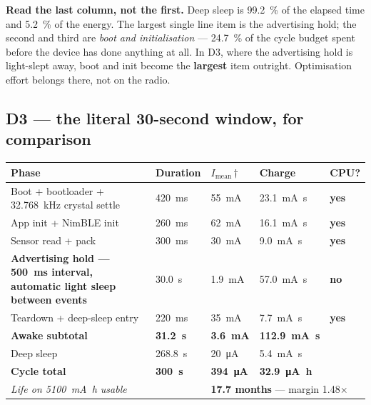 \documentclass[11pt,a4paper]{article}
\newcommand{\yes}{\textcolor{ok}{\textbf{yes}}}
\newcommand{\no}{\textcolor{warn}{\textbf{no}}}
\newcommand{\mock}{\textcolor{warn}{$\dagger$}}
\begin{document}
\medskip
\noindent
\textbf{Read the last column, not the first.} Deep sleep is \SI{99.2}{\percent} of the elapsed time
and \SI{5.2}{\percent} of the energy. The largest single line item is the advertising hold; the
second and third are \emph{boot and initialisation} --- \SI{24.7}{\percent} of the cycle budget
spent before the device has done anything at all. In D3, where the advertising hold is
light-slept away, boot and init become the \textbf{largest} item outright. Optimisation effort
belongs there, not on the radio.

\subsection{D3 --- the literal 30-second window, for comparison}

\begin{center}
\begin{tabularx}{\textwidth}{Xllll}
\toprule
\textbf{Phase} & \textbf{Duration} & \textbf{$I_\text{mean}$\,\mock} & \textbf{Charge} & \textbf{CPU?} \\
\midrule
Boot + bootloader + \SI{32.768}{\kilo\hertz} crystal settle & \SI{420}{\milli\second} & \SI{55}{\milli\ampere} & \SI{23.1}{\milli\ampere\second} & \yes \\
App init + NimBLE init                                      & \SI{260}{\milli\second} & \SI{62}{\milli\ampere} & \SI{16.1}{\milli\ampere\second} & \yes \\
Sensor read + pack                                          & \SI{300}{\milli\second} & \SI{30}{\milli\ampere} & \SI{9.0}{\milli\ampere\second}  & \yes \\
\textbf{Advertising hold --- \SI{500}{\milli\second} interval, automatic light sleep between events} & \SI{30.0}{\second} & \SI{1.9}{\milli\ampere} & \SI{57.0}{\milli\ampere\second} & \no \\
Teardown + deep-sleep entry                                 & \SI{220}{\milli\second} & \SI{35}{\milli\ampere} & \SI{7.7}{\milli\ampere\second}  & \yes \\
\midrule
\textbf{Awake subtotal} & \textbf{\SI{31.2}{\second}} & \textbf{\SI{3.6}{\milli\ampere}} & \textbf{\SI{112.9}{\milli\ampere\second}} & \\
Deep sleep              & \SI{268.8}{\second} & \SI{20}{\micro\ampere} & \SI{5.4}{\milli\ampere\second} & \\
\midrule
\textbf{Cycle total} & \textbf{\SI{300}{\second}} & \textbf{\SI{394}{\micro\ampere}} & \textbf{\SI{32.9}{\micro\ampere\hour}} & \\
\midrule
\multicolumn{2}{l}{\textit{Life on \SI{5100}{\milli\ampere\hour} usable}} & \multicolumn{3}{l}{\textcolor{ok}{\textbf{17.7 months}} --- margin \num{1.48}$\times$} \\
\bottomrule
\end{tabularx}
\end{center}
\end{document}
